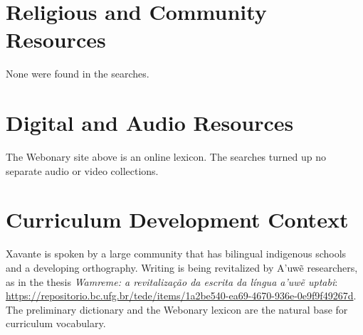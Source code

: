 \documentclass[12pt]{article}
\begin{document}
\section{Religious and Community Resources}
None were found in the searches.

\section{Digital and Audio Resources}
The Webonary site above is an online lexicon. The searches turned up no separate audio or video collections.

\section{Curriculum Development Context}
Xavante is spoken by a large community that has bilingual indigenous schools and a developing orthography. Writing is being revitalized by A'uw\~e researchers, as in the thesis \emph{Wamreme: a revitaliza\c{c}\~ao da escrita da l\'ingua a'uw\~e uptabi}: \url{https://repositorio.bc.ufg.br/tede/items/1a2be540-ea69-4670-936e-0e9f9f49267d}. The preliminary dictionary and the Webonary lexicon are the natural base for curriculum vocabulary.
\end{document}
